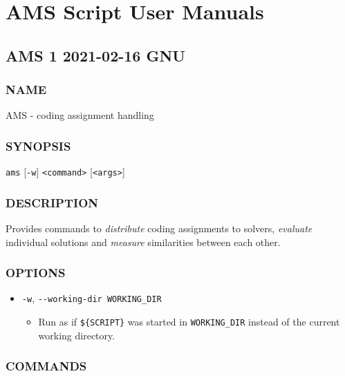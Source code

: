 \chapter{AMS Script User Manuals}\label{chap:ams-script-documentation}

\section{AMS 1 2021-02-16 GNU}\label{ams-1-2021-02-16-gnu-user-manuals}

\subsection{NAME}\label{name}

AMS - coding assignment handling

\subsection{SYNOPSIS}\label{synopsis}

\texttt{ams} {[}\texttt{-w}{]} \texttt{\textless{}command\textgreater{}} {[}\texttt{\textless{}args\textgreater{}}{]}

\subsection{DESCRIPTION}\label{description}

Provides commands to \emph{distribute} coding assignments to solvers, \emph{evaluate} individual solutions and \emph{measure} similarities between each other.

\subsection{OPTIONS}\label{options}

\begin{itemize}
\item
  \texttt{-w}, \texttt{-\/-working-dir\ WORKING\_DIR}

  \begin{itemize}
  \item
    Run as if \texttt{\$\{SCRIPT\}} was started in \texttt{WORKING\_DIR} instead of the current working directory.
  \end{itemize}
\end{itemize}

\subsection{COMMANDS}\label{commands}


